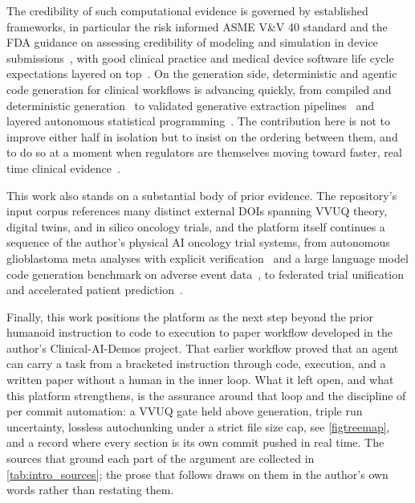 The
credibility of such computational evidence is governed by established frameworks,
in particular the risk informed ASME V\&V 40 standard and the FDA guidance on
assessing credibility of modeling and simulation in device
submissions~\cite{asmevv40, fda2023credibility}, with good clinical practice and
medical device software life cycle expectations layered on
top~\cite{iche6r3, iec62304}. On the generation side, deterministic and agentic
code generation for clinical workflows is advancing quickly, from compiled and
deterministic generation~\cite{trooskens2026compiled} to validated generative
extraction pipelines~\cite{carlisle2026pipeline} and layered autonomous
statistical programming~\cite{yan2026clinagent}. The contribution here is not to
improve either half in isolation but to insist on the ordering between them, and
to do so at a moment when regulators are themselves moving toward faster, real
time clinical evidence~\cite{fda2026realtime}.

This work also stands on a substantial body of prior evidence. The repository's
input corpus references many distinct external DOIs spanning VVUQ theory, digital
twins, and in silico oncology trials, and the platform itself continues a
sequence of the author's physical AI oncology trial systems, from autonomous
glioblastoma meta analyses with explicit verification~\cite{kawchak2025glioblastoma}
and a large language model code generation benchmark on adverse event
data~\cite{kawchak2025faers}, to federated trial unification~\cite{kawchak2026federated}
and accelerated patient prediction~\cite{kawchak2026prediction}. 

Finally, this work positions the platform as the next step beyond the prior
humanoid instruction to code to execution to paper workflow developed in the
author's Clinical-AI-Demos project. That earlier workflow proved that an agent
can carry a task from a bracketed instruction through code, execution, and a
written paper without a human in the inner loop. What it left open, and what this
platform strengthens, is the assurance around that loop and the discipline of
per commit automation: a VVUQ gate held above generation, triple run
uncertainty, lossless autochunking under a strict file size cap, see \autoref{figtreemap}, and a record
where every section is its own commit pushed in real time. The sources that
ground each part of the argument are collected in \autoref{tab:intro_sources};
the prose that follows draws on them in the author's own words rather than
restating them.

